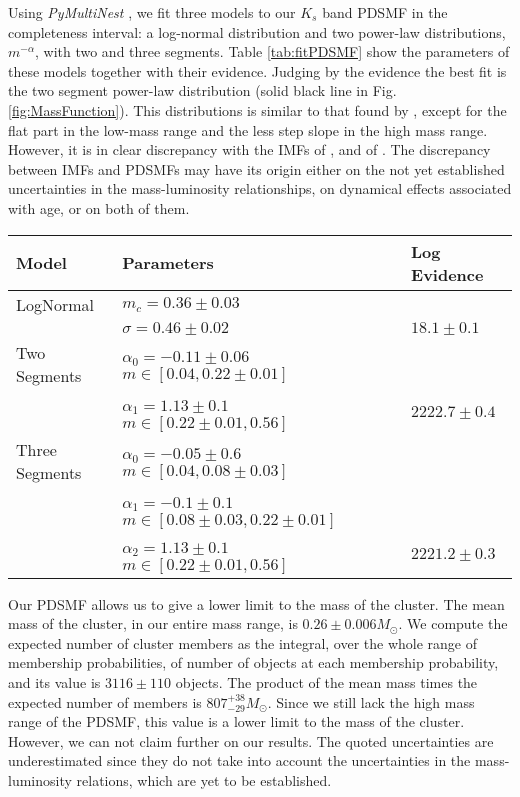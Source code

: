 Using \emph{PyMultiNest} \citep{Buchner2014}, we fit three models to our $K_s$ band PDSMF in the completeness interval: a log-normal distribution and two power-law distributions, $m^{-\alpha}$, with two and three segments. Table \ref{tab:fitPDSMF} show the parameters of these models together with their evidence. Judging by the evidence the best fit is the two segment power-law distribution (solid black line in Fig. \ref{fig:MassFunction}). This distributions is similar to that found by \citet{Bouy2015}, except for the flat part in the low-mass range and the less step slope in the high mass range. However, it is in clear discrepancy with the IMFs of \citet{Chabrier2005},  \cite[$m_c=0.25_{-0.016}^{+0.021}$ and $\sigma=0.55_{-0.01}^{+0.05}$, the uncertainties are those reported by][for single objects]{Chabrier2003} and of \citet{Thies2007}. The discrepancy between IMFs and PDSMFs may have its origin either on the not yet established uncertainties in the mass-luminosity relationships, on dynamical effects associated with age, or on both of them.

\begin{table*}[ht!]
\caption{Parameters and evidence of models fitted to the PDSMF}
\begin{center}
\begin{tabular}{lll}
Model&Parameters& Log Evidence\\
\hline
LogNormal&$m_c=0.36\pm0.03$&\\
                 &$\sigma=0.46\pm0.02$ & $18.1 \pm 0.1$\\
\hline
Two Segments &$\alpha_0=-0.11\pm0.06$ \ \ $m \in [0.04,0.22\pm0.01]$ & \\ 
&  $\alpha_1=1.13\pm0.1$ \ \ $m \in [0.22\pm0.01,0.56]$&$2222.7\pm0.4$\\
\hline
Three Segments &$\alpha_0=-0.05\pm0.6$ \ \ $m \in [0.04,0.08\pm0.03]$ & \\
                          &$\alpha_1=-0.1\pm0.1$ \ \ $m \in [0.08\pm0.03,0.22\pm0.01]$ & \\ 
                          &$\alpha_2=1.13\pm0.1$ \ \ $m \in [0.22\pm0.01,0.56]$&$2221.2\pm 0.3$\\
\hline
\end{tabular}
\end{center}
\label{tab:fitPDSMF}
\end{table*}%

Our PDSMF allows us to give a lower limit to the mass of the cluster. The mean mass of the cluster, in our entire mass range, is $0.26 \pm 0.006 M_{\odot}$. We compute the expected number of cluster members as the integral, over the whole range of membership probabilities, of number of objects at each membership probability, and its value is $3116 \pm 110$ objects. The product of the mean mass times the expected number of members is $807^{+38}_{-29} M_{\odot}$. Since we still lack the high mass range of the PDSMF, this value is a lower limit to the mass of the cluster. However, we can not claim further on our results. The quoted uncertainties are underestimated since they do not take into account the uncertainties in the mass-luminosity relations, which are yet to be established.

